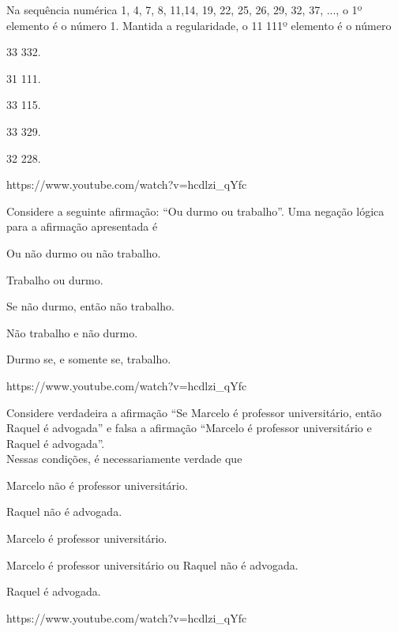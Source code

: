 \questao{}
{Na sequência numérica 1, 4, 7, 8, 11,14, 19, 22, 25, 26, 29, 32, 37, ..., o 1º elemento é o número 1. Mantida a regularidade, o 11 111º elemento é o número}
{
\item 33 332.
\item 31 111.
\item 33 115.
\item 33 329.
\item 32 228.}
{https://www.youtube.com/watch?v=hcdlzi_qYfc}

\questao{}
{Considere a seguinte afirmação: “Ou durmo ou trabalho”. Uma negação lógica para a afirmação apresentada é}
{
\item Ou não durmo ou não trabalho.
\item Trabalho ou durmo.
\item Se não durmo, então não trabalho.
\item Não trabalho e não durmo.
\item Durmo se, e somente se, trabalho.}
{https://www.youtube.com/watch?v=hcdlzi_qYfc}

\questao{}
{Considere verdadeira a afirmação “Se Marcelo é professor universitário, então Raquel é advogada” e falsa a afirmação “Marcelo é professor universitário e Raquel é advogada”.\\
Nessas condições, é necessariamente verdade que}
{
\item Marcelo não é professor universitário.
\item Raquel não é advogada.
\item Marcelo é professor universitário.
\item Marcelo é professor universitário ou Raquel não é advogada.
\item Raquel é advogada.}
{https://www.youtube.com/watch?v=hcdlzi_qYfc}




